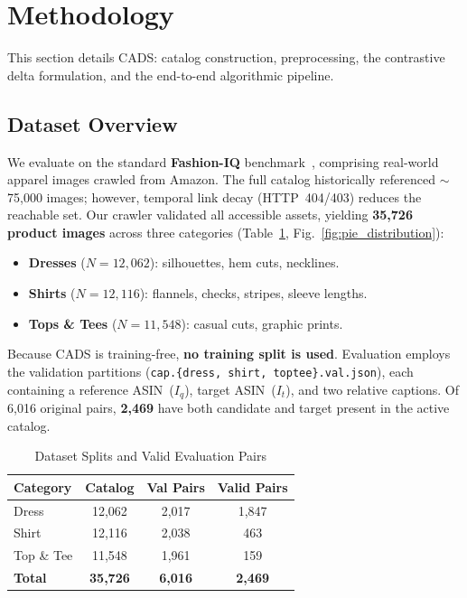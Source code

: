 \documentclass[conference]{IEEEtran}
\begin{document}
\section{Methodology}

This section details CADS: catalog construction, preprocessing, the contrastive delta formulation, and the end-to-end algorithmic pipeline.

\subsection{Dataset Overview}
We evaluate on the standard \textbf{Fashion-IQ} benchmark~\cite{wu2021fashioniq}, comprising real-world apparel images crawled from Amazon. The full catalog historically referenced ${\sim}$75{,}000 images; however, temporal link decay (HTTP~404/403) reduces the reachable set. Our crawler validated all accessible assets, yielding \textbf{35{,}726 product images} across three categories (Table~\ref{tab:splits}, Fig.~\ref{fig:pie_distribution}):
\begin{itemize}
    \item \textbf{Dresses} ($N=12{,}062$): silhouettes, hem cuts, necklines.
    \item \textbf{Shirts} ($N=12{,}116$): flannels, checks, stripes, sleeve lengths.
    \item \textbf{Tops \& Tees} ($N=11{,}548$): casual cuts, graphic prints.
\end{itemize}

Because CADS is training-free, \textbf{no training split is used}. Evaluation employs the validation partitions (\texttt{cap.\{dress, shirt, toptee\}.val.json}), each containing a reference ASIN~($I_q$), target ASIN~($I_t$), and two relative captions. Of 6{,}016 original pairs, \textbf{2{,}469} have both candidate and target present in the active catalog.

\begin{table}[!t]
\centering
\caption{Dataset Splits and Valid Evaluation Pairs}
\label{tab:splits}
\begin{tabular}{@{}lccc@{}}
\toprule
\textbf{Category} & \textbf{Catalog} & \textbf{Val Pairs} & \textbf{Valid Pairs} \\ \midrule
Dress       & 12{,}062 & 2{,}017 & 1{,}847 \\
Shirt       & 12{,}116 & 2{,}038 & 463 \\
Top \& Tee  & 11{,}548 & 1{,}961 & 159 \\ \midrule
\textbf{Total} & \textbf{35{,}726} & \textbf{6{,}016} & \textbf{2{,}469} \\ \bottomrule
\end{tabular}
\end{table}
\end{document}
